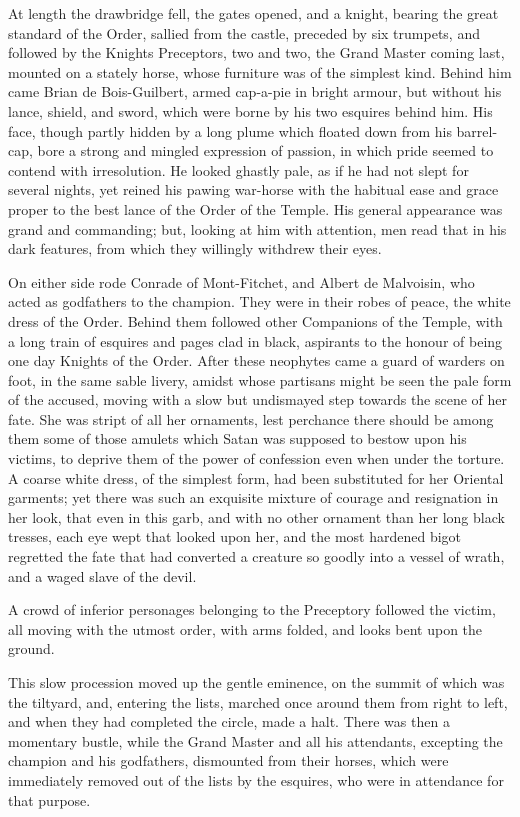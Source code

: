 At length the drawbridge fell, the gates opened, and a knight, bearing
the great standard of the Order, sallied from the castle, preceded by
six trumpets, and followed by the Knights Preceptors, two and two, the
Grand Master coming last, mounted on a stately horse, whose furniture
was of the simplest kind. Behind him came Brian de Bois-Guilbert, armed
cap-a-pie in bright armour, but without his lance, shield, and sword,
which were borne by his two esquires behind him. His face, though partly
hidden by a long plume which floated down from his barrel-cap, bore a
strong and mingled expression of passion, in which pride seemed to
contend with irresolution. He looked ghastly pale, as if he had not
slept for several nights, yet reined his pawing war-horse with the
habitual ease and grace proper to the best lance of the Order of the
Temple. His general appearance was grand and commanding; but, looking at
him with attention, men read that in his dark features, from which they
willingly withdrew their eyes.

On either side rode Conrade of Mont-Fitchet, and Albert de Malvoisin,
who acted as godfathers to the champion. They were in their robes of
peace, the white dress of the Order. Behind them followed other
Companions of the Temple, with a long train of esquires and pages clad
in black, aspirants to the honour of being one day Knights of the Order.
After these neophytes came a guard of warders on foot, in the same sable
livery, amidst whose partisans might be seen the pale form of the
accused, moving with a slow but undismayed step towards the scene of her
fate. She was stript of all her ornaments, lest perchance there should
be among them some of those amulets which Satan was supposed to bestow
upon his victims, to deprive them of the power of confession even when
under the torture. A coarse white dress, of the simplest form, had been
substituted for her Oriental garments; yet there was such an exquisite
mixture of courage and resignation in her look, that even in this garb,
and with no other ornament than her long black tresses, each eye wept
that looked upon her, and the most hardened bigot regretted the fate
that had converted a creature so goodly into a vessel of wrath, and a
waged slave of the devil.

A crowd of inferior personages belonging to the Preceptory followed the
victim, all moving with the utmost order, with arms folded, and looks
bent upon the ground.

This slow procession moved up the gentle eminence, on the summit of
which was the tiltyard, and, entering the lists, marched once around
them from right to left, and when they had completed the circle, made a
halt. There was then a momentary bustle, while the Grand Master and all
his attendants, excepting the champion and his godfathers, dismounted
from their horses, which were immediately removed out of the lists by
the esquires, who were in attendance for that purpose.

